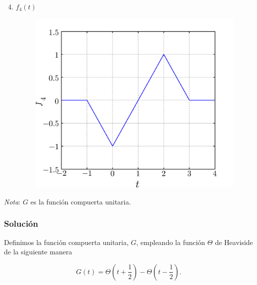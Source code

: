 \documentclass[a4paper,12pt,final]{article}
\begin{document}
      \begin{minipage}[t]{0.5\textwidth}
        \begin{enumerate}[label=\alph*)]
          \setcounter{enumi}{3}
          \item $f_4\left(t\right)$
            \vspace{-1.0em}
            \begin{figure}[H]
              \begin{flushright}
                \includegraphics[width=\textwidth-30pt]{./laboratorio_4/problema01_f4.png}
              \end{flushright}
            \end{figure}\vspace{-1.0em}
        \end{enumerate}
      \end{minipage}%

      \noindent \emph{Nota}: $G$ es la función compuerta unitaria.

    \subsubsection*{Solución}
      \noindent Definimos la función compuerta unitaria, $G$, empleando la función
      $\Theta$ de Heaviside de la siguiente manera

      \begin{equation*}
         G\left(t\right) = \Theta\left(t + \frac{1}{2}\right) -
                           \Theta\left(t - \frac{1}{2}\right).
      \end{equation*}
\end{document}
